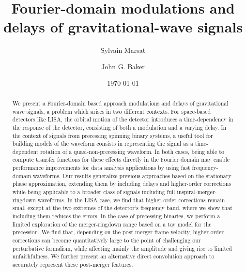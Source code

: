 \documentclass[aps,showpacs,twocolumn,
prd,superscriptaddress,nofootinbib]{revtex4-1}
\begin{document}
\title{Fourier-domain modulations and delays of gravitational-wave signals}

\author{Sylvain Marsat}
\author{John G. Baker}

\date{\today}

\begin{abstract}

We present a Fourier-domain based approach modulations and delays of gravitational wave signals, a problem which arises in two different contexts. For space-based detectors like LISA, the orbital motion of the detector introduces a time-dependency in the response of the detector, consisting of both a modulation and a varying delay. In the context of signals from precessing spinning binary systems, a useful tool for building models of the waveform consists in representing the signal as a time-dependent rotation of a quasi-non-precessing waveform. In both cases, being able to compute transfer functions for these effects directly in the Fourier domain may enable performance improvements for data analysis applications by using fast frequency-domain waveforms. Our results generalize previous approaches based on the stationary phase approximation, extending them by including delays and higher-order corrections while being applicable to a broader class of signals including full inspiral-merger-ringdown waveforms. In the LISA case, we find that higher-order corrections remain small except at the two extremes of the detector's frequency band, where we show that including them reduces the errors. In the case of precessing binaries, we perform a limited exploration of the merger-ringdown range based on a toy model for the precession. We find that, depending on the post-merger frame velocity, higher-order corrections can become quantitatively large to the point of challenging our perturbative formalism, while affecting mainly the amplitude and giving rise to limited unfaithfulness. We further present an alternative direct convolution approach to accurately represent these post-merger features.

\end{abstract}

\end{document}
